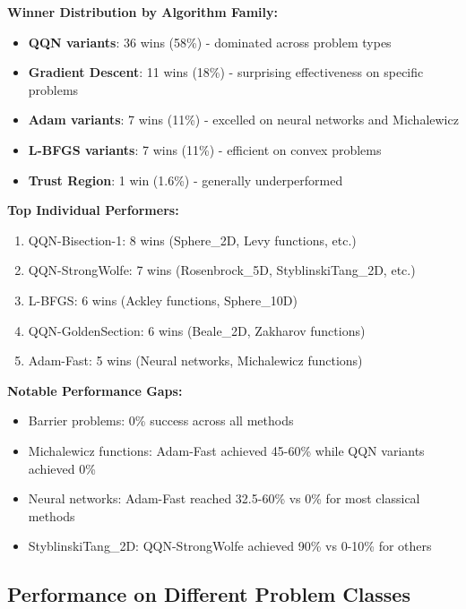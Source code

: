 \textbf{Winner Distribution by Algorithm Family:}

\begin{itemize}
\tightlist
\item
  \textbf{QQN variants}: 36 wins (58\%) - dominated across problem types
\item
  \textbf{Gradient Descent}: 11 wins (18\%) - surprising effectiveness on specific problems
\item
  \textbf{Adam variants}: 7 wins (11\%) - excelled on neural networks and Michalewicz
\item
  \textbf{L-BFGS variants}: 7 wins (11\%) - efficient on convex problems
\item
  \textbf{Trust Region}: 1 win (1.6\%) - generally underperformed
\end{itemize}

\textbf{Top Individual Performers:}

\begin{enumerate}
\def\labelenumi{\arabic{enumi}.}
\tightlist
\item
  QQN-Bisection-1: 8 wins (Sphere\_2D, Levy functions, etc.)
\item
  QQN-StrongWolfe: 7 wins (Rosenbrock\_5D, StyblinskiTang\_2D, etc.)
\item
  L-BFGS: 6 wins (Ackley functions, Sphere\_10D)
\item
  QQN-GoldenSection: 6 wins (Beale\_2D, Zakharov functions)
\item
  Adam-Fast: 5 wins (Neural networks, Michalewicz functions)
\end{enumerate}

\textbf{Notable Performance Gaps:}

\begin{itemize}
\tightlist
\item
  Barrier problems: 0\% success across all methods
\item
  Michalewicz functions: Adam-Fast achieved 45-60\% while QQN variants achieved 0\%
\item
  Neural networks: Adam-Fast reached 32.5-60\% vs 0\% for most classical methods
\item
  StyblinskiTang\_2D: QQN-StrongWolfe achieved 90\% vs 0-10\% for others
\end{itemize}

\hypertarget{performance-on-different-problem-classes}{%
\subsection{Performance on Different Problem Classes}\label{performance-on-different-problem-classes}}

